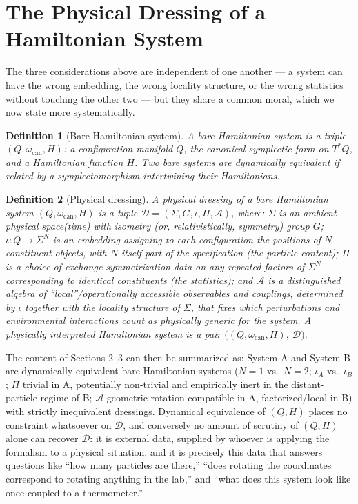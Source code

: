 \documentclass[11pt]{article}
\newtheorem{definition}{Definition}
\begin{document}
\section{The Physical Dressing of a Hamiltonian System}

The three considerations above are independent of one another --- a system can have the wrong embedding, the wrong locality structure, or the wrong statistics without touching the other two --- but they share a common moral, which we now state more systematically.

\begin{definition}[Bare Hamiltonian system]
A \emph{bare Hamiltonian system} is a triple $(Q,\omega_{\mathrm{can}},H)$: a configuration manifold $Q$, the canonical symplectic form on $T^*Q$, and a Hamiltonian function $H$. Two bare systems are \emph{dynamically equivalent} if related by a symplectomorphism intertwining their Hamiltonians.
\end{definition}

\begin{definition}[Physical dressing]
A \emph{physical dressing} of a bare Hamiltonian system $(Q,\omega_{\mathrm{can}},H)$ is a tuple $\mathcal{D}=(\Sigma,G,\iota,\Pi,\mathcal{A})$, where: $\Sigma$ is an ambient physical space(time) with isometry (or, relativistically, symmetry) group $G$; $\iota:Q\to\Sigma^N$ is an embedding assigning to each configuration the positions of $N$ constituent objects, with $N$ itself part of the specification (the \emph{particle content}); $\Pi$ is a choice of exchange-symmetrization data on any repeated factors of $\Sigma^N$ corresponding to identical constituents (the \emph{statistics}); and $\mathcal{A}$ is a distinguished algebra of ``local''/operationally accessible observables and couplings, determined by $\iota$ together with the locality structure of $\Sigma$, that fixes which perturbations and environmental interactions count as physically generic for the system. A \emph{physically interpreted Hamiltonian system} is a pair $\big((Q,\omega_{\mathrm{can}},H),\ \mathcal{D}\big)$.
\end{definition}

The content of Sections 2--3 can then be summarized as: System A and System B are dynamically equivalent bare Hamiltonian systems ($N=1$ vs.\ $N=2$; $\iota_A$ vs.\ $\iota_B$; $\Pi$ trivial in A, potentially non-trivial and empirically inert in the distant-particle regime of B; $\mathcal{A}$ geometric-rotation-compatible in A, factorized/local in B) with strictly inequivalent dressings. Dynamical equivalence of $(Q,H)$ places no constraint whatsoever on $\mathcal{D}$, and conversely no amount of scrutiny of $(Q,H)$ alone can recover $\mathcal{D}$: it is external data, supplied by whoever is applying the formalism to a physical situation, and it is precisely this data that answers questions like ``how many particles are there,'' ``does rotating the coordinates correspond to rotating anything in the lab,'' and ``what does this system look like once coupled to a thermometer.''
\end{document}
